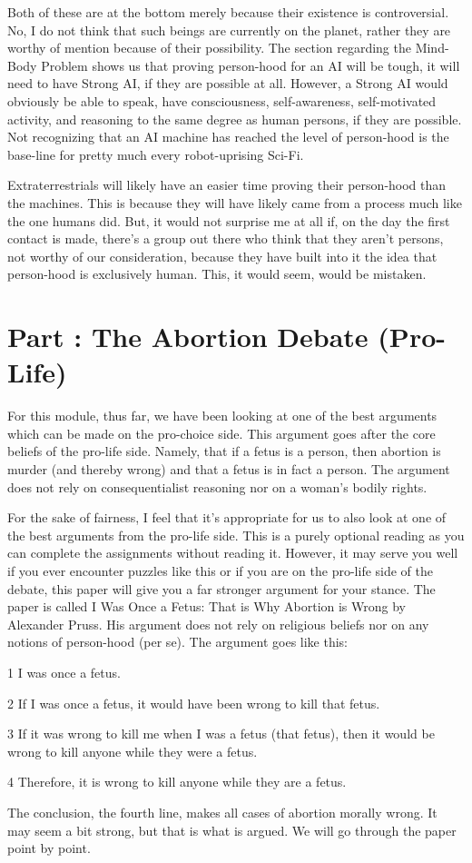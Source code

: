 Both of these are at the bottom merely because their existence is controversial. No, I do not think that such beings are currently on the planet, rather they are worthy of mention because of their possibility. The section regarding the Mind-Body Problem shows us that proving person-hood for an AI will be tough, it will need to have Strong AI, if they are possible at all. However, a Strong AI would obviously be able to speak, have consciousness, self-awareness, self-motivated activity, and reasoning to the same degree as human persons, if they are possible. Not recognizing that an AI machine has reached the level of person-hood is the base-line for pretty much every robot-uprising Sci-Fi. 

Extraterrestrials will likely have an easier time proving their person-hood than the machines. This is because they will have likely came from a process much like the one humans did. But, it would not surprise me at all if, on the day the first contact is made, there's a group out there who think that they aren't persons, not worthy of our consideration, because they have built into it the idea that person-hood is exclusively human. This, it would seem, would be mistaken. 
\chapter{Part \thechapcount: The Abortion Debate (Pro-Life)}
For this module, thus far, we have been looking at one of the best arguments which can be made on the pro-choice side. This argument goes after the core beliefs of the pro-life side. Namely, that if a fetus is a person, then abortion is murder (and thereby wrong) and that a fetus is in fact a person. The argument does not rely on consequentialist reasoning nor on a woman's bodily rights.

For the sake of fairness, I feel that it's appropriate for us to also look at one of the best arguments from the pro-life side.  This is a purely optional reading as you can complete the assignments without reading it. However, it may serve you well if you ever encounter puzzles like this or if you are on the pro-life side of the debate, this paper will give you a far stronger argument for your stance. The paper is called I Was Once a Fetus: That is Why Abortion is Wrong by Alexander Pruss. His argument does not rely on religious beliefs nor on any notions of person-hood (per se). The argument goes like this:
\begin{earg}
    \item[1 ]I was once a fetus.
    \item[2 ]If I was once a fetus, it would have been wrong to kill that fetus.
    \item[3 ]If it was wrong to kill me when I was a fetus (that fetus), then it would be wrong to kill anyone while they were a fetus.
    \item[4 ]Therefore, it is wrong to kill anyone while they are a fetus.
\end{earg}
The conclusion, the fourth line, makes all cases of abortion morally wrong. It may seem a bit strong, but that is what is argued. We will go through the paper point by point.
